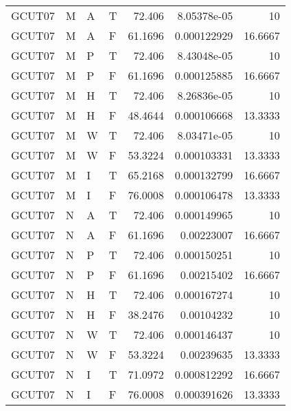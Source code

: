 \begin{tabular}{llllrrr}
    GCUT07   & M     & A     & T          & 72.406     & 8.05378e-05 & 10       \\
    GCUT07   & M     & A     & F          & 61.1696    & 0.000122929 & 16.6667  \\
    GCUT07   & M     & P     & T          & 72.406     & 8.43048e-05 & 10       \\
    GCUT07   & M     & P     & F          & 61.1696    & 0.000125885 & 16.6667  \\
    GCUT07   & M     & H     & T          & 72.406     & 8.26836e-05 & 10       \\
    GCUT07   & M     & H     & F          & 48.4644    & 0.000106668 & 13.3333  \\
    GCUT07   & M     & W     & T          & 72.406     & 8.03471e-05 & 10       \\
    GCUT07   & M     & W     & F          & 53.3224    & 0.000103331 & 13.3333  \\
    GCUT07   & M     & I     & T          & 65.2168    & 0.000132799 & 16.6667  \\
    GCUT07   & M     & I     & F          & 76.0008    & 0.000106478 & 13.3333  \\
    GCUT07   & N     & A     & T          & 72.406     & 0.000149965 & 10       \\
    GCUT07   & N     & A     & F          & 61.1696    & 0.00223007  & 16.6667  \\
    GCUT07   & N     & P     & T          & 72.406     & 0.000150251 & 10       \\
    GCUT07   & N     & P     & F          & 61.1696    & 0.00215402  & 16.6667  \\
    GCUT07   & N     & H     & T          & 72.406     & 0.000167274 & 10       \\
    GCUT07   & N     & H     & F          & 38.2476    & 0.00104232  & 10       \\
    GCUT07   & N     & W     & T          & 72.406     & 0.000146437 & 10       \\
    GCUT07   & N     & W     & F          & 53.3224    & 0.00239635  & 13.3333  \\
    GCUT07   & N     & I     & T          & 71.0972    & 0.000812292 & 16.6667  \\
    GCUT07   & N     & I     & F          & 76.0008    & 0.000391626 & 13.3333  \\
    \hline
\end{tabular}